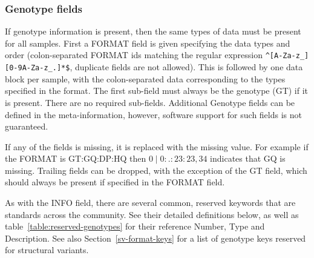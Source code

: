 \documentclass[8pt]{article}
\begin{document}
\subsubsection{Genotype fields}
If genotype information is present, then the same types of data must be present for all samples. First a FORMAT field is given specifying the data types and order (colon-separated FORMAT ids matching the regular expression \texttt{\^{}[A-Za-z\_][0-9A-Za-z\_.]*\$}, duplicate fields are not allowed). This is followed by one data block per sample, with the colon-separated data corresponding to the types specified in the format. The first sub-field must always be the genotype (GT) if it is present. There are no required sub-fields. Additional Genotype fields can be defined in the meta-information, however, software support for such fields is not guaranteed.

If any of the fields is missing, it is replaced with the missing value. For example if the FORMAT is GT:GQ:DP:HQ then $0\mid0:.:23:23,34$ indicates that GQ is missing. Trailing fields can be dropped, with the exception of the GT field, which should always be present if specified in the FORMAT field.

As with the INFO field, there are several common, reserved keywords that are standards across the community. See their detailed definitions below, as well as table~\ref{table:reserved-genotypes} for their reference Number, Type and Description. See also Section~\ref{sv-format-keys} for a list of genotype keys reserved for structural variants.
\end{document}
